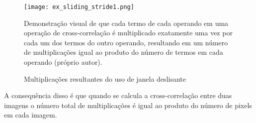 \begin{figure}[!htb]
	\centering
	\texttt{[image: ex\_sliding\_stride1.png]}
	\caption{Multiplicações resultantes do uso de janela deslisante}
	\label{fig:ex_sliding_stride1}
	Demonstração visual de que cada termo de cada operando em uma operação de
	cross-correlação é multiplicado exatamente uma vez por cada um dos termos do
	outro operando, resultando em um número de multiplicações igual ao produto
	do número de termos em cada operando (próprio autor).
\end{figure}

A consequência disso é que quando se calcula a cross-correlação entre duas
imagens o número total de multiplicações é igual ao produto do número de pixels
em cada imagem.
